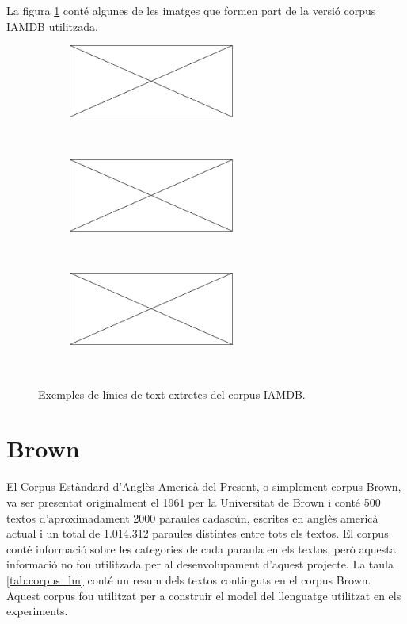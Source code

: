 La figura \ref{fig:iamdb_examples} conté algunes de les imatges que formen part de la versió corpus IAMDB utilitzada.
\begin{figure}
\centering
\begin{subfigure}[b]{0.8\textwidth}
\centering
\includegraphics[width=0.6\textwidth]{images/pending_image.eps}
\end{subfigure}\\
\begin{subfigure}[b]{0.8\textwidth}
\centering
\includegraphics[width=0.6\textwidth]{images/pending_image.eps}
\end{subfigure}\\
\begin{subfigure}[b]{0.8\textwidth}
\centering
\includegraphics[width=0.6\textwidth]{images/pending_image.eps}
\end{subfigure}\\
\caption{Exemples de línies de text extretes del corpus IAMDB.}\label{fig:iamdb_examples}
\end{figure}

\section{Brown}\label{sec:corpus_brown}
El Corpus Estàndard d'Anglès Americà del Present, o simplement corpus Brown, va ser presentat originalment el 1961\cite{francis1979brown} per la Universitat de Brown i conté 500 textos d'aproximadament 2000 paraules cadascún, escrites en anglès americà actual i un total de 1.014.312 paraules distintes entre tots els textos. El corpus conté informació sobre les categories de cada paraula en els textos, però aquesta informació no fou utilitzada per al desenvolupament d'aquest projecte. La taula \ref{tab:corpus_lm} conté un resum dels textos continguts en el corpus Brown. Aquest corpus fou utilitzat per a construir el model del llenguatge utilitzat en els experiments.


